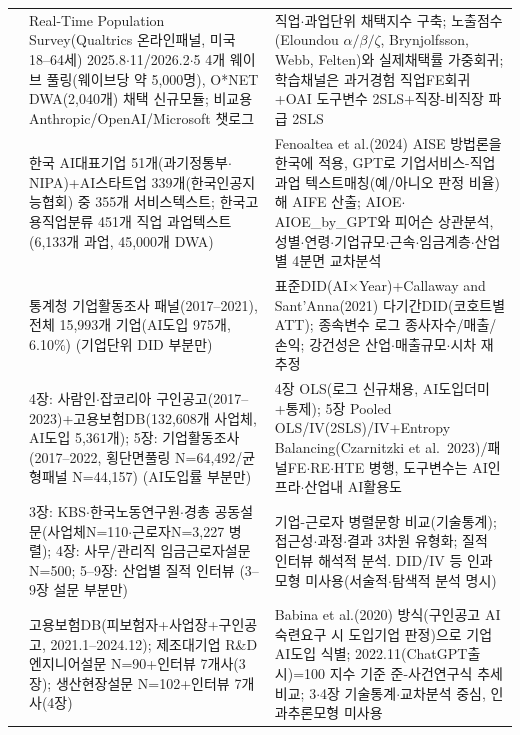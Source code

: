 \documentclass[11pt]{article}
\begin{document}
\begin{longtable}{L{2.5cm}L{6.4cm}L{6.4cm}}
\citet{bick-2026-what-work-does-generative} &
Real-Time Population Survey(Qualtrics 온라인패널, 미국 18--64세) 2025.8$\cdot$11/2026.2$\cdot$5 4개 웨이브 풀링(웨이브당 약 5,000명), O*NET DWA(2,040개) 채택 신규모듈; 비교용 Anthropic/OpenAI/Microsoft 챗로그 &
직업$\cdot$과업단위 채택지수 구축; 노출점수(Eloundou $\alpha/\beta/\zeta$, Brynjolfsson, Webb, Felten)와 실제채택률 가중회귀; 학습채널은 과거경험 직업FE회귀+OAI 도구변수 2SLS+직장-비직장 파급 2SLS\\

\citet{cheon-2025-ai-exposure-vs-ai-adoption} &
한국 AI대표기업 51개(과기정통부$\cdot$NIPA)+AI스타트업 339개(한국인공지능협회) 중 355개 서비스텍스트; 한국고용직업분류 451개 직업 과업텍스트(6,133개 과업, 45,000개 DWA) &
Fenoaltea et al.(2024) AISE 방법론을 한국에 적용, GPT로 기업서비스-직업과업 텍스트매칭(예/아니오 판정 비율)해 AIFE 산출; AIOE$\cdot$AIOE\_by\_GPT와 피어슨 상관분석, 성별$\cdot$연령$\cdot$기업규모$\cdot$근속$\cdot$임금계층$\cdot$산업별 4분면 교차분석\\

\citet{kiet-2024-ai-labor-market-industry} &
통계청 기업활동조사 패널(2017--2021), 전체 15,993개 기업(AI도입 975개, 6.10\%) (기업단위 DID 부분만) &
표준DID(AI$\times$Year)+Callaway and Sant'Anna(2021) 다기간DID(코호트별 ATT); 종속변수 로그 종사자수/매출/손익; 강건성은 산업$\cdot$매출규모$\cdot$시차 재추정\\

\citet{chang-2024-ai-development-employment-effects} &
4장: 사람인$\cdot$잡코리아 구인공고(2017--2023)+고용보험DB(132,608개 사업체, AI도입 5,361개); 5장: 기업활동조사(2017--2022, 횡단면풀링 N=64,492/균형패널 N=44,157) (AI도입률 부분만) &
4장 OLS(로그 신규채용, AI도입더미+통제); 5장 Pooled OLS/IV(2SLS)/IV+Entropy Balancing(Czarnitzki et al.\ 2023)/패널FE$\cdot$RE$\cdot$HTE 병행, 도구변수는 AI인프라$\cdot$산업내 AI활용도\\

\citet{noh-2025-ai-labor-coexistence} &
3장: KBS$\cdot$한국노동연구원$\cdot$경총 공동설문(사업체N=110$\cdot$근로자N=3,227 병렬); 4장: 사무/관리직 임금근로자설문 N=500; 5--9장: 산업별 질적 인터뷰 (3--9장 설문 부분만) &
기업-근로자 병렬문항 비교(기술통계); 접근성$\cdot$과정$\cdot$결과 3차원 유형화; 질적 인터뷰 해석적 분석. DID/IV 등 인과모형 미사용(서술적$\cdot$탐색적 분석 명시)\\

\citet{noh-2025-ai-based-manufacturing-innovation-employment} &
고용보험DB(피보험자+사업장+구인공고, 2021.1--2024.12); 제조대기업 R\&D엔지니어설문 N=90+인터뷰 7개사(3장); 생산현장설문 N=102+인터뷰 7개사(4장) &
Babina et al.(2020) 방식(구인공고 AI숙련요구 시 도입기업 판정)으로 기업 AI도입 식별; 2022.11(ChatGPT출시)=100 지수 기준 준-사건연구식 추세비교; 3$\cdot$4장 기술통계$\cdot$교차분석 중심, 인과추론모형 미사용\\
\end{longtable}
\end{document}
